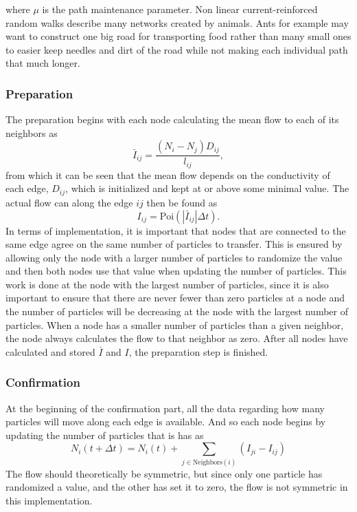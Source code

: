 \noindent where $\mu$ is the path maintenance parameter. Non linear current-reinforced random walks describe many networks created by animals. Ants for example may want to construct one big road for transporting food rather than many small ones to easier keep needles and dirt of the road while not making each individual path that much longer.


\subsubsection{Preparation}
The preparation begins with each node calculating the mean flow to each of its neighbors as
\begin{equation}
\bar{I}_{ij} = \frac{(N_i - N_j)D_{ij}}{l_{ij}},
\end{equation}
from which it can be seen that the mean flow depends on the conductivity of each edge, $D_{ij}$, which is initialized and kept at or above some minimal value.
The actual flow can along the edge $ij$ then be found as
\begin{equation}
I_{ij} = \text{Poi}(|\bar{I}_{ij}|\Delta t).
\end{equation}
In terms of implementation, it is important that nodes that are connected to the same edge agree on the same number of particles to transfer. This is ensured by allowing only the node with a larger number of particles to randomize the value and then both nodes use that value when updating the number of particles. This work is done at the node with the largest number of particles, since it is also important to ensure that there are never fewer than zero particles at a node and the number of particles will be decreasing at the node with the largest number of particles. When a node has a smaller number of particles than a given neighbor, the node always calculates the flow to that neighbor as zero. After all nodes have calculated and stored $\bar{I}$ and $I$, the preparation step is finished.

\subsubsection{Confirmation}
At the beginning of the confirmation part, all the data regarding how many particles will move along each edge is available. And so each node begins by updating the number of particles that is has as
 \begin{equation}
 N_i(t + \Delta t) = N_i(t) + \sum_{j \in \text{Neighbors}(i)} \left( I_{ji} - I_{ij} \right)
 \end{equation}
 The flow should theoretically be symmetric, but since only one particle has randomized a value, and the other has set it to zero, the flow is not symmetric in this implementation.
 
